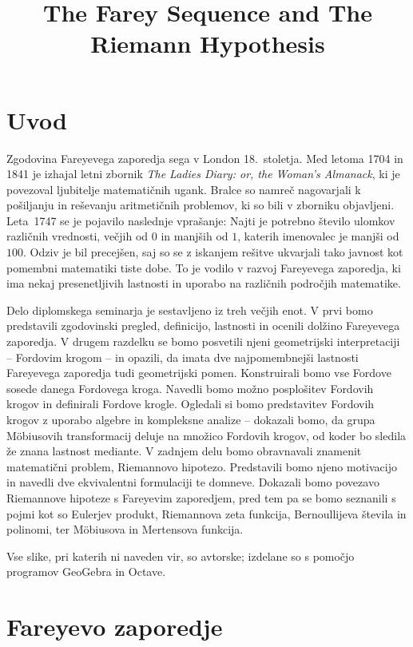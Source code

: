 \documentclass[mat1]{fmfdelo}
\title{The Farey Sequence and The Riemann Hypothesis}
\begin{document}
%
\section{Uvod}

Zgodovina Fareyevega zaporedja sega v London 18.~stoletja. Med letoma 1704 in 1841 je izhajal letni zbornik \emph{The Ladies Diary: or, the Woman's Almanack}, ki je povezoval ljubitelje matematičnih ugank. Bralce so namreč nagovarjali k pošiljanju in reševanju aritmetičnih problemov, ki so bili v zborniku objavljeni. Leta~1747 se je pojavilo naslednje vprašanje: Najti je potrebno število ulomkov različnih vrednosti, večjih od $0$ in manjših od $1$, katerih imenovalec je manjši od $100$. Odziv je bil precejšen, saj so se z iskanjem rešitve ukvarjali tako javnost kot pomembni matematiki tiste dobe. To je vodilo v razvoj Fareyevega zaporedja, ki ima nekaj presenetljivih lastnosti in uporabo na različnih področjih matematike.

Delo diplomskega seminarja je sestavljeno iz treh večjih enot. V prvi bomo predstavili zgodovinski pregled, definicijo, lastnosti in ocenili dolžino Fareyevega zaporedja. V drugem razdelku se bomo posvetili njeni geometrijski interpretaciji -- Fordovim krogom -- in opazili, da imata dve najpomembnejši lastnosti Fareyevega zaporedja tudi geometrijski pomen. Konstruirali bomo vse Fordove sosede danega Fordovega kroga. Navedli bomo možno posplošitev Fordovih krogov in definirali Fordove krogle. Ogledali si bomo predstavitev Fordovih krogov z uporabo algebre in kompleksne analize -- dokazali bomo, da grupa M\"obiusovih transformacij deluje na množico Fordovih krogov, od koder bo sledila že znana lastnost mediante. V zadnjem delu bomo obravnavali znamenit matematični problem, Riemannovo hipotezo. Predstavili bomo njeno motivacijo in navedli dve ekvivalentni formulaciji te domneve. Dokazali bomo povezavo Riemannove hipoteze s Fareyevim zaporedjem, pred tem pa se bomo seznanili s pojmi kot so Eulerjev produkt, Riemannova zeta funkcija, Bernoullijeva števila in polinomi, ter M\"obiusova in Mertensova funkcija.

Vse slike, pri katerih ni naveden vir, so avtorske; izdelane so s pomočjo programov GeoGebra in Octave.

%
\section{Fareyevo zaporedje}
\end{document}
